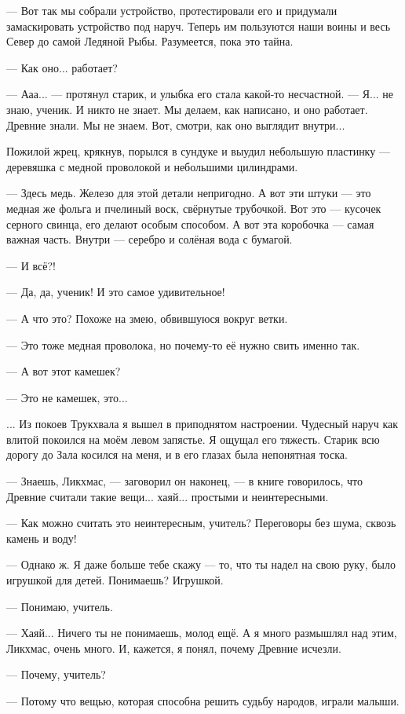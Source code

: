 --- Вот так мы собрали устройство, протестировали его и придумали замаскировать устройство под наруч.
Теперь им пользуются наши воины и весь Север до самой Ледяной Рыбы.
Разумеется, пока это тайна.

--- Как оно... работает?

--- Ааа... --- протянул старик, и улыбка его стала какой-то несчастной.
--- Я... не знаю, ученик.
И никто не знает.
Мы делаем, как написано, и оно работает.
Древние знали.
Мы не знаем.
Вот, смотри, как оно выглядит внутри...

Пожилой жрец, крякнув, порылся в сундуке и выудил небольшую пластинку --- деревяшка с медной проволокой и небольшими цилиндрами.

--- Здесь медь.
Железо для этой детали непригодно.
А вот эти штуки --- это медная же фольга и пчелиный воск, свёрнутые трубочкой.
Вот это --- кусочек серного свинца, его делают особым способом.
А вот эта коробочка --- самая важная часть.
Внутри --- серебро и солёная вода с бумагой.

--- И всё?!

--- Да, да, ученик!
И это самое удивительное!

--- А что это?
Похоже на змею, обвившуюся вокруг ветки.

--- Это тоже медная проволока, но почему-то её нужно свить именно так.

--- А вот этот камешек?

--- Это не камешек, это...

... Из покоев Трукхвала я вышел в приподнятом настроении.
Чудесный наруч как влитой покоился на моём левом запястье.
Я ощущал его тяжесть.
Старик всю дорогу до Зала косился на меня, и в его глазах была непонятная тоска.

--- Знаешь, Ликхмас, --- заговорил он наконец, --- в книге говорилось, что Древние считали такие вещи... хаяй... простыми и неинтересными.

--- Как можно считать это неинтересным, учитель?
Переговоры без шума, сквозь камень и воду!

--- Однако ж.
Я даже больше тебе скажу --- то, что ты надел на свою руку, было игрушкой для детей.
Понимаешь?
Игрушкой.

--- Понимаю, учитель.

--- Хаяй... Ничего ты не понимаешь, молод ещё.
А я много размышлял над этим, Ликхмас, очень много.
И, кажется, я понял, почему Древние исчезли.

--- Почему, учитель?

--- Потому что вещью, которая способна решить судьбу народов, играли малыши.

